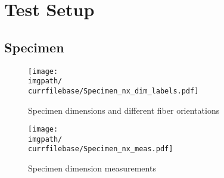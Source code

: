 \chapter{Test Setup}
\label{chap:\currfilebase}

\section{Specimen}
\begin{figure}[!ht]
    \centering
    \texttt{[image: \\imgpath/\\currfilebase/Specimen\_nx\_dim\_labels.pdf]}
    \caption{Specimen dimensions and different fiber orientations}
    \label{fig:Specimen_nx_dim_labels}
\end{figure}
\begin{figure}[!ht]
    \centering
    \texttt{[image: \\imgpath/\\currfilebase/Specimen\_nx\_meas.pdf]}
    \caption{Specimen dimension measurements}
    \label{fig:Specimen_nx_meas}
\end{figure}

